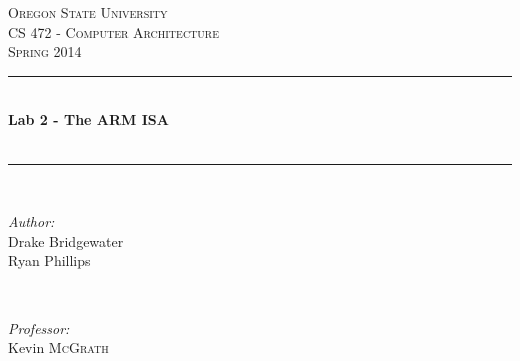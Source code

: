 \documentclass[letterpaper,12pt,titlepage]{article}
\def\name{Drake Bridgewater \\  Ryan Phillips}
\def\title{Lab 2 - The ARM ISA}
\def\subtitle{}
\def\subject{CS }
\def\courseNumber{ 472 }
\def\courseName{Computer Architecture }
\def\courseInfo{Spring 2014 }%
\def\supervisor{Kevin \textsc{McGrath}} %
\begin{document}
\begin{titlepage}

\newcommand{\HRule}{\rule{\linewidth}{0.5mm}} %

\center %
 

\textsc{\LARGE Oregon State University}\\[1.5cm] %
\textsc{\Large \subject \courseNumber - \courseName}\\[0.5cm] %
\textsc{\large \courseInfo}\\[0.5cm] %


\HRule \\[0.4cm]
{ \huge \bfseries \title }\\[0.4cm] %
{\small \textit{\subtitle}}\\[0.4cm]
\HRule \\[1.5cm]
 

\begin{minipage}{0.4\textwidth}
\begin{flushleft} \large
\emph{Author:}\\
\name
\end{flushleft}
\end{minipage}
~
\begin{minipage}{0.4\textwidth}
\begin{flushright} \large
\emph{Professor:} \\
\supervisor
\end{flushright}
\end{minipage}\\[4cm]



\end{titlepage}
\end{document}
